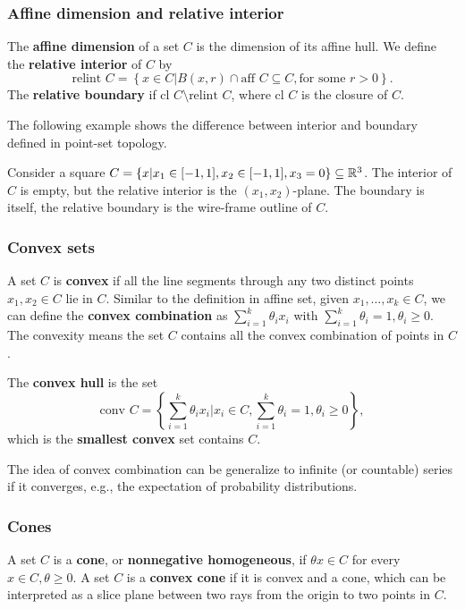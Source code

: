 \subsubsection{Affine dimension and relative interior}
The \textbf{affine dimension} of a set $C$ is the dimension of its affine hull. We define the \textbf{relative interior} of $C$ by
\[
\text{relint } C = \left\{ x \in C | B(x, r) \cap \text{aff }C \subseteq C, \text{for some } r > 0 \right\}.
\]
The \textbf{relative boundary} if $\text{cl } C \setminus \text{relint } C$, where $\text{cl } C$ is the closure of $C$.

The following example shows the difference between interior and boundary defined in point-set topology.
\begin{example}
    Consider a square $C=\left\{ x|x_1\in[-1, 1], x_2\in[-1, 1], x_3=0 \right\} \subseteq \mathbb{R}^3$. The interior of $C$ is empty, but the relative interior is the $(x_1, x_2)$-plane. The boundary is itself, the relative boundary is the wire-frame outline of $C$.
\end{example}

\subsubsection{Convex sets}
A set $C$ is \textbf{convex} if all the line segments through any two distinct points $x_1, x_2 \in C$ lie in $C$. Similar to the definition in affine set, given $x_1,\dots, x_k \in C$, we can define the \textbf{convex combination} as $\sum_{i=1}^{k}\theta_i x_i$ with $\sum_{i=1}^{k}\theta_i=1, \theta_i \geq 0$. The convexity means the set $C$ contains all the convex combination of points in $C$.

The \textbf{convex hull} is the set
\[
\text{conv } C = \left\{ \sum_{i=1}^{k}\theta_i x_i |x_i \in C, \sum_{i=1}^{k}\theta_i=1, \theta_i \geq 0\right\},
\]
which is the \textbf{smallest convex} set contains $C$.

The idea of convex combination can be generalize to infinite (or countable) series if it converges, e.g., the expectation of probability distributions.

\subsubsection{Cones}
A set $C$ is a \textbf{cone}, or \textbf{nonnegative homogeneous}, if $\theta x \in C$ for every $x\in C, \theta \geq 0$. A set $C$ is a \textbf{convex cone} if it is convex and a cone, which can be interpreted as a slice plane between two rays from the origin to two points in $C$.

